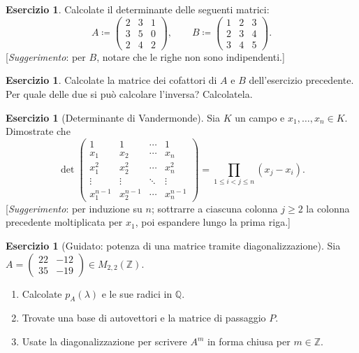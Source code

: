 \documentclass[11pt, a4paper]{book}
\theoremstyle{definition}
\newtheorem{esercizio}[definizione]{Esercizio}
\theoremstyle{plain}
\theoremstyle{remark}
\newcommand{\Z}{\mathbb{Z}}
\newcommand{\Q}{\mathbb{Q}}
\begin{document}
\begin{esercizio}
Calcolate il determinante delle seguenti matrici:
\[
  A \coloneqq \begin{pmatrix}2&3&1\\3&5&0\\2&4&2\end{pmatrix}, \qquad
  B \coloneqq \begin{pmatrix}1&2&3\\2&3&4\\3&4&5\end{pmatrix}.
\]
[\emph{Suggerimento}: per $B$, notare che le righe non sono indipendenti.]
\end{esercizio}

\begin{esercizio}
Calcolate la matrice dei cofattori di $A$ e $B$ dell'esercizio precedente. Per quale delle due si può calcolare l'inversa? Calcolatela.
\end{esercizio}

\begin{esercizio}[Determinante di Vandermonde]
Sia $K$ un campo e $x_1,\ldots,x_n \in K$. Dimostrate che
\[
  \det\begin{pmatrix}1&1&\cdots&1\\x_1&x_2&\cdots&x_n\\x_1^2&x_2^2&\cdots&x_n^2\\\vdots&\vdots&\ddots&\vdots\\x_1^{n-1}&x_2^{n-1}&\cdots&x_n^{n-1}\end{pmatrix}
  = \prod_{1\leq i < j \leq n}(x_j - x_i).
\]
[\emph{Suggerimento}: per induzione su $n$; sottrarre a ciascuna colonna $j\geq 2$ la colonna precedente moltiplicata per $x_1$, poi espandere lungo la prima riga.]
\end{esercizio}

\begin{esercizio}[Guidato: potenza di una matrice tramite diagonalizzazione]
Sia $A = \begin{pmatrix}22&-12\\35&-19\end{pmatrix} \in M_{2,2}(\Z)$.
\begin{enumerate}
  \item Calcolate $p_A(\lambda)$ e le sue radici in $\Q$.
  \item Trovate una base di autovettori e la matrice di passaggio $P$.
  \item Usate la diagonalizzazione per scrivere $A^m$ in forma chiusa per $m \in \Z$.
\end{enumerate}
\end{esercizio}
\end{document}
